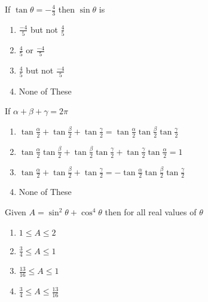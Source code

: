 \iffalse
\title{Trignometric Functions and Equations}
\author{EE24BTECH11001- ADITYA TRIPATHY}
\section{mcq-single}
\fi
	\item If $\tan\theta =-\frac{4}{3}$ then $\sin \theta$ is 
		
		\hfill{}
		
  
		\begin{enumerate}
				\item $\frac{-4}{5}$ but not $\frac{4}{5}$ 
				\item $\frac{4}{5}$ or $\frac{-4}{5}$ 
				\item $\frac{4}{5}$ but not $\frac{-4}{5}$ 
				\item None of These 
		\end{enumerate}
  

  
	\item If $\alpha+ \beta +\gamma = 2\pi$ 
		\hfill{}
  
		\begin{enumerate}
  
  
			\item $\tan\frac{\alpha}{2} + \tan\frac{\beta}{2} + \tan\frac{\gamma}{2} = \tan\frac{\alpha}{2}\tan\frac{\beta}{2}\tan\frac{\gamma}{2}$
  
  
			\item $\tan\frac{\alpha}{2}\tan\frac{\beta}{2} + \tan\frac{\beta}{2}\tan\frac{\gamma}{2}+ \tan\frac{\gamma}{2}\tan\frac{\alpha}{2} = 1$
  
			\item $\tan\frac{\alpha}{2} + \tan\frac{\beta}{2} + \tan\frac{\gamma}{2} = -\tan\frac{\alpha}{2}\tan\frac{\beta}{2}\tan\frac{\gamma}{2}$
  
			\item None of These
  
 
		\end{enumerate}
  
  

	\item Given $A = \sin^{2}\theta + \cos^{4}\theta $ then for all real values of $\theta$ 
		\hfill{}
  
		\begin{enumerate}
				\item $1 \le A \le2$
  				\item $\frac{3}{4} \le A\le 1$ 
				\item $\frac{13}{16} \le A\le 1$
				\item $\frac{3}{4} \le A\le \frac{13}{16}$ 
		\end{enumerate}
  


